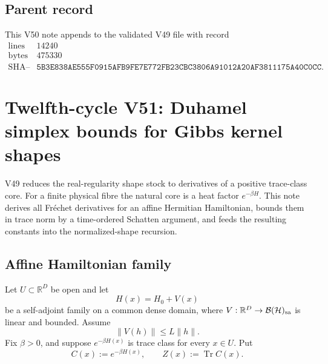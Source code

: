 \documentclass[11pt]{article}
\theoremstyle{remark}
\begin{document}
\subsection{Parent record}

This V50 note appends to the validated V49 file with record
\[
\begin{array}{c|c}
\text{lines}&14240\\
\text{bytes}&475330\\
\text{SHA--256}&
\texttt{5B3E838AE555F0915AFB9FE7E772FB23CBC3806A91012A20AF3811175A40C0CC}.
\end{array}
\]


\section{Twelfth-cycle V51: Duhamel simplex bounds for Gibbs kernel
shapes}
\label{sec:v12v51}

V49 reduces the real-regularity shape stock to derivatives of a
positive trace-class core.  For a finite physical fibre the natural
core is a heat factor \(e^{-\beta H}\).  This note derives all
Fr\'echet derivatives for an affine Hermitian Hamiltonian, bounds
them in trace norm by a time-ordered Schatten argument, and feeds
the resulting constants into the normalized-shape recursion.

\subsection{Affine Hamiltonian family}

Let \(U\subset\mathbb R^D\) be open and let
\[
 H(x)=H_0+V(x)
\]
be a self-adjoint family on a common dense domain, where
\(V:\mathbb R^D\to{\cal B}({\cal H})_{\rm sa}\) is linear and
bounded.  Assume
\begin{equation}
 \|V(h)\|\leq L\|h\|.                              \tag{51.1}
\end{equation}
Fix \(\beta>0\), and suppose \(e^{-\beta H(x)}\) is trace class for
every \(x\in U\).  Put
\begin{equation}
 C(x):=e^{-\beta H(x)},\qquad
 Z(x):=\operatorname{Tr}C(x).                    \tag{51.2}
\end{equation}
\end{document}
